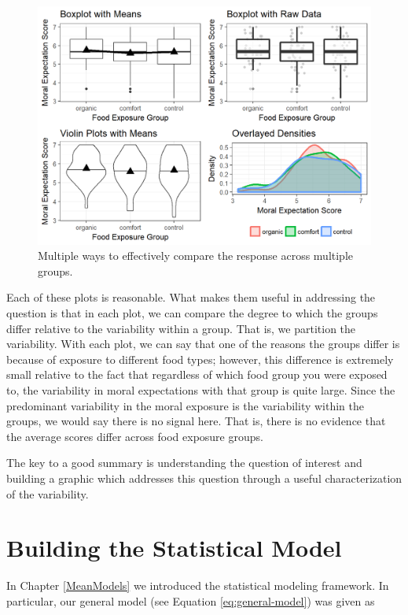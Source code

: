 \documentclass[]{book}
\theoremstyle{plain}
\theoremstyle{mydefn}
\theoremstyle{myexmpl}
\theoremstyle{remark}
\begin{document}
\begin{figure}

{\centering \includegraphics[width=0.8\linewidth]{./Images/anovasummaries-organic-comparison-1} 

}

\caption{Multiple ways to effectively compare the response across multiple groups.}\label{fig:anovasummaries-organic-comparison}
\end{figure}

Each of these plots is reasonable. What makes them useful in addressing
the question is that in each plot, we can compare the degree to which
the groups differ relative to the variability within a group. That is,
we partition the variability. With each plot, we can say that one of the
reasons the groups differ is because of exposure to different food
types; however, this difference is extremely small relative to the fact
that regardless of which food group you were exposed to, the variability
in moral expectations with that group is quite large. Since the
predominant variability in the moral exposure is the variability within
the groups, we would say there is no signal here. That is, there is no
evidence that the average scores differ across food exposure groups.

The key to a good summary is understanding the question of interest and
building a graphic which addresses this question through a useful
characterization of the variability.

\chapter{Building the Statistical Model}\label{ANOVAmodel}

In Chapter \ref{MeanModels} we introduced the statistical modeling
framework. In particular, our general model (see Equation
\eqref{eq:general-model}) was given as
\end{document}
